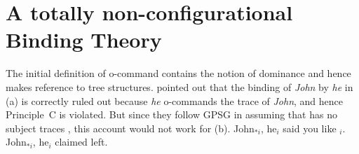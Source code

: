 \documentclass[output=paper,biblatex,babelshorthands,newtxmath,draftmode,colorlinks,citecolor=brown]{langscibook}
\begin{document}
\section{A totally non-configurational Binding Theory}
\label{sec-totally-non-configurational-BT}

\largerpage
The initial definition of o-command contains the notion of dominance and hence makes reference to
tree structures. \citet[]{ps2} pointed out that the binding of \emph{John} by \emph{he} in
(a) is correctly ruled out because \emph{he} o-commands the trace of \emph{John}, and hence
Principle~C is violated. But since they follow GPSG in assuming that  has no subject traces
\citep[Chapter~4.4]{ps2}, this account would not work for (b). 
\eal
\label{ex-subject-object-extraction-traceless}
\ex John$_{*i}$, he$_i$ said you like \trace$_i$.
\ex John$_{*i}$, he$_i$ claimed left.
\zl
\end{document}
